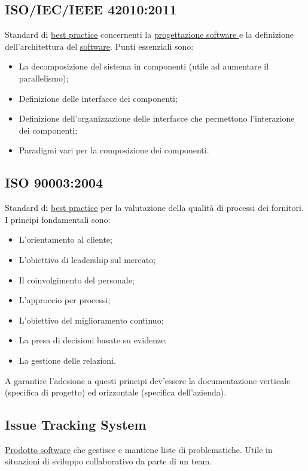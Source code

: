 	\subsection{ISO/IEC/IEEE 42010:2011}
	\label{sec:iso12207}
	Standard di \underline{\hyperref[sec:bestpractice]{best practice}} concernenti la \underline{\hyperref[sec:progettazionesoftware]{progettazione software }} e la definizione dell'architettura del \underline{\hyperref[sec:prodottosoftware]{software}}. Punti essenziali sono:
	\begin{itemize}  
	\item La decomposizione del sistema in componenti (utile ad aumentare il parallelismo);
	\item Definizione delle interfacce dei componenti;
	\item Definizione dell'organizzazione delle interfacce che permettono l'interazione dei componenti;
	\item Paradigmi vari per la composizione dei componenti.
	\end{itemize}		

	\subsection{ISO 90003:2004}
	\label{sec:iso90003}
	Standard di \underline{\hyperref[sec:bestpractice]{best practice}} per la valutazione della qualità di processi dei fornitori. I principi fondamentali sono:
	\begin{itemize}  
	\item L'orientamento al cliente;
	\item L'obiettivo di leadership sul mercato;
	\item Il coinvolgimento del personale;
	\item L'approccio per processi;
	\item L'obiettivo del miglioramento continuo;
	\item La presa di decisioni basate su evidenze;
	\item La gestione delle relazioni.
	\end{itemize}	
	A garantire l'adesione a questi principi dev'essere la documentazione verticale (specifica di progetto) ed orizzontale (specifica dell'azienda).
	
	\subsection{Issue Tracking System}
	\label{sec:issuetrack}
	\underline{\hyperref[sec:prodottosoftware]{Prodotto software}} che gestisce e mantiene liste di problematiche. Utile in situazioni di sviluppo collaborativo da parte di un team.
	

